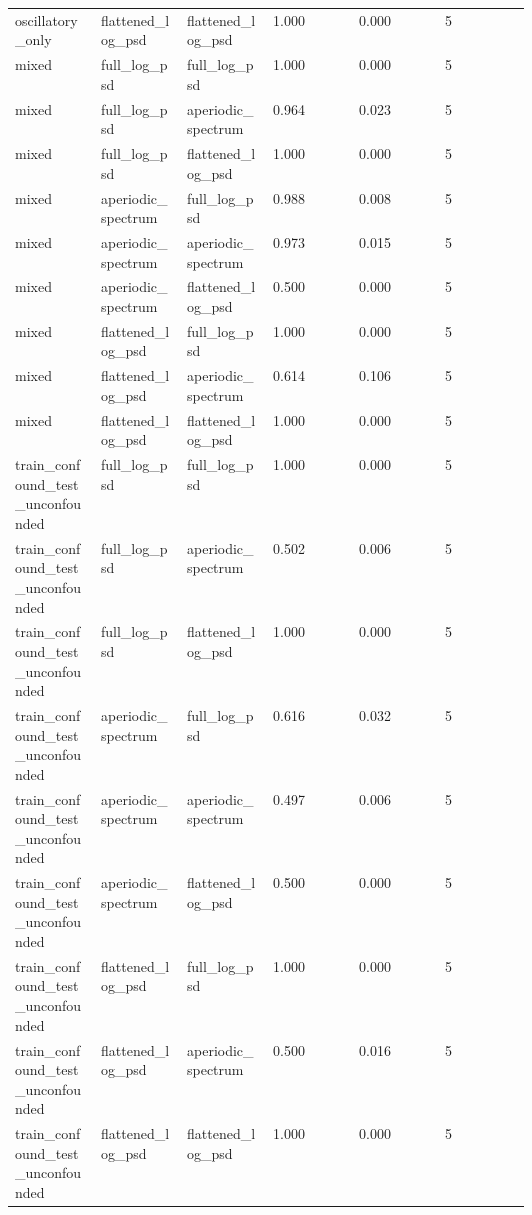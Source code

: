 \begin{longtable}{p{0.10\linewidth}p{0.10\linewidth}p{0.10\linewidth}p{0.10\linewidth}p{0.10\linewidth}p{0.10\linewidth}}
oscillatory\_only & flattened\_log\_psd & flattened\_log\_psd & 1.000 & 0.000 & 5\\
mixed & full\_log\_psd & full\_log\_psd & 1.000 & 0.000 & 5\\
mixed & full\_log\_psd & aperiodic\_spectrum & 0.964 & 0.023 & 5\\
mixed & full\_log\_psd & flattened\_log\_psd & 1.000 & 0.000 & 5\\
mixed & aperiodic\_spectrum & full\_log\_psd & 0.988 & 0.008 & 5\\
mixed & aperiodic\_spectrum & aperiodic\_spectrum & 0.973 & 0.015 & 5\\
mixed & aperiodic\_spectrum & flattened\_log\_psd & 0.500 & 0.000 & 5\\
mixed & flattened\_log\_psd & full\_log\_psd & 1.000 & 0.000 & 5\\
mixed & flattened\_log\_psd & aperiodic\_spectrum & 0.614 & 0.106 & 5\\
mixed & flattened\_log\_psd & flattened\_log\_psd & 1.000 & 0.000 & 5\\
train\_confound\_test\_unconfounded & full\_log\_psd & full\_log\_psd & 1.000 & 0.000 & 5\\
train\_confound\_test\_unconfounded & full\_log\_psd & aperiodic\_spectrum & 0.502 & 0.006 & 5\\
train\_confound\_test\_unconfounded & full\_log\_psd & flattened\_log\_psd & 1.000 & 0.000 & 5\\
train\_confound\_test\_unconfounded & aperiodic\_spectrum & full\_log\_psd & 0.616 & 0.032 & 5\\
train\_confound\_test\_unconfounded & aperiodic\_spectrum & aperiodic\_spectrum & 0.497 & 0.006 & 5\\
train\_confound\_test\_unconfounded & aperiodic\_spectrum & flattened\_log\_psd & 0.500 & 0.000 & 5\\
train\_confound\_test\_unconfounded & flattened\_log\_psd & full\_log\_psd & 1.000 & 0.000 & 5\\
train\_confound\_test\_unconfounded & flattened\_log\_psd & aperiodic\_spectrum & 0.500 & 0.016 & 5\\
train\_confound\_test\_unconfounded & flattened\_log\_psd & flattened\_log\_psd & 1.000 & 0.000 & 5\\
\bottomrule
\end{longtable}
